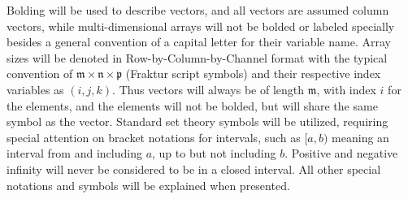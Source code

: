 %
%
%
%
%
%
%
%
%

%
%
%
\indent
Bolding will be used to describe vectors, and all vectors are assumed column vectors, while multi-dimensional arrays will not be bolded or labeled specially besides a general convention of a capital letter for their variable name. Array sizes will be denoted in Row-by-Column-by-Channel format with the typical convention of $\mathfrak{m} \times \mathfrak{n} \times \mathfrak{p}$ (Fraktur script symbols) and their respective index variables as $(i,j,k)$. Thus vectors will always be of length $\mathfrak{m}$, with index $i$ for the elements, and the elements will not be bolded, but will share the same symbol as the vector. Standard set theory symbols will be utilized, requiring special attention on bracket notations for intervals, such as $[a,b)$ meaning an interval from and including $a$, up to but not including $b$. Positive and negative infinity will never be considered to be in a closed interval. All other special notations and symbols will be explained when presented.



